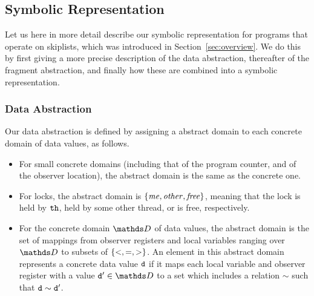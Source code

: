 
\subsection{Symbolic Representation}
\label{subsect:symbrep}
Let us here in more detail describe our symbolic representation for programs that
operate on skiplists, which was introduced in Section~\ref{sec:overview}.
We do this by first giving a more precise description of the data abstraction,
thereafter of the fragment abstraction, and finally how these are combined
into a symbolic representation.

\vspace*{-0.6cm}
\subsubsection{Data Abstraction}
Our data abstraction is defined by assigning a
abstract domain to each concrete domain of data values, as follows.
\begin{itemize}
\item For small concrete domains (including that of the program counter, and
  of the observer location),
  the abstract domain is the same as the concrete one.
\item
  For locks, the abstract domain is $\left\{\mathit{me},\mathit{other},\mathit{free}\right\}$,
  meaning that the lock is held by ${\tt th}$,  held by some other thread, or is
  free, respectively.
\item For the concrete domain $\ddomain$ of data values, the abstract domain
  is the set of mappings from observer registers and local variables
  ranging over $\ddomain$ to subsets of $\left\{<,=,>\right\}$.
  An element in this abstract domain represents a concrete data value $\tt d$
  if it maps each local variable and observer register with a value ${\tt d'} \in \ddomain$
  to a set which includes a relation $\sim$ such that $\tt d \sim \tt d'$.
\end{itemize}

